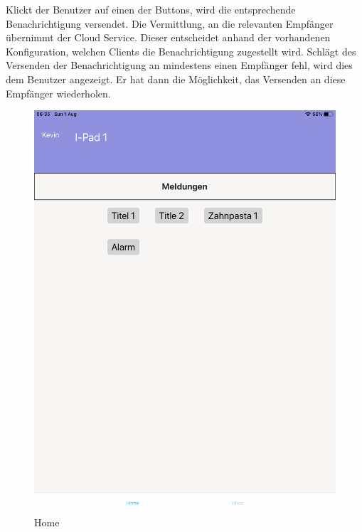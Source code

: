 Klickt der Benutzer auf einen der Buttons, wird die entsprechende Benachrichtigung versendet.
Die Vermittlung, an die relevanten Empfänger übernimmt der Cloud Service.
Dieser entscheidet anhand der vorhandenen Konfiguration, welchen Clients die Benachrichtigung zugestellt wird.
Schlägt des Versenden der Benachrichtigung an mindestens einen Empfänger fehl, wird dies dem Benutzer angezeigt.
Er hat dann die Möglichkeit, das Versenden an diese Empfänger wiederholen.

\begin{figure}[h]
    \centering
    \begin{minipage}[b]{0.4\textwidth}
        \includegraphics[width=\textwidth]{graphics/screenshots/mobileclient/screenshot-homescreen}
        \caption{Home}
    \end{minipage}
    \hfill
    \begin{minipage}[b]{0.4\textwidth}

\end{minipage}
\end{figure}
